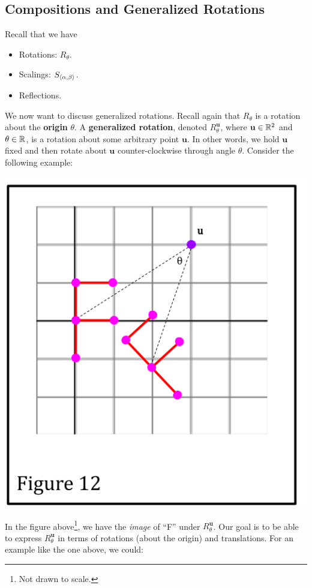 \documentclass[letterpaper]{article}
\begin{document}
\subsection{Compositions and Generalized Rotations}
Recall that we have
\begin{itemize}
    \item Rotations: $R_{\theta}$.
    \item Scalings: $S_{\langle \alpha, \beta \rangle}$.
    \item Reflections.
\end{itemize}
We now want to discuss generalized rotations. Recall again that $R_{\theta}$ is a rotation about the \textbf{origin} $\theta$. A \textbf{generalized rotation}, denoted $R_{\theta}^{\mathbf{u}}$, where $\mathbf{u} \in \mathbb{R}^2$ and $\theta \in \mathbb{R}$, is a rotation about some arbitrary point $\mathbf{u}$. In other words, we hold $\mathbf{u}$ fixed and then rotate about $\mathbf{u}$ counter-clockwise through angle $\theta$. Consider the following example: 
\begin{center}
    \includegraphics[scale=0.4]{../assets/f11.png}
\end{center}
In the figure above\footnote{Not drawn to scale.}, we have the \emph{image} of ``F'' under $R_{\theta}^{\mathbf{u}}$. Our goal is to be able to express $R_{\theta}^{\mathbf{u}}$ in terms of rotations (about the origin) and translations. For an example like the one above, we could:
\end{document}
